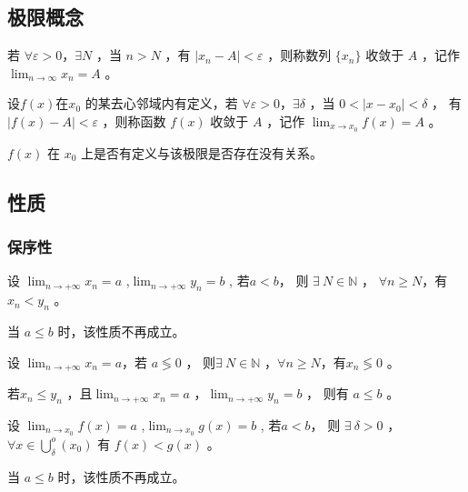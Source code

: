 \subsection{极限概念}

若 $ \forall \varepsilon>0$，$ \exists N $ ，当 $ n>N $ ，有 $ |x_n-A|<\varepsilon $ ，则称数列 $ \{x_n\} $ 收敛于 $ A $  ，记作
$ \displaystyle\lim_{n\rightarrow\infty}x_n=A $ 。

设$ f(x) $在$ x_0 $ 的某去心邻域内有定义，若 $ \forall \varepsilon>0$，$ \exists \delta $ ，当 $ 0<|x-x_0|<\delta $ ，
有 $ |f(x)-A|<\varepsilon $ ，则称函数 $ f(x) $ 收敛于 $ A $  ，记作
$ \displaystyle\lim_{x\rightarrow x_0}f(x)=A $ 。

$ f(x) $ 在 $ x_{0} $ 上是否有定义与该极限是否存在没有关系。

\subsection{性质}

\subsubsection{保序性}

\begin{Theo}[保序性]

    设 $ \displaystyle\lim_{n\rightarrow +\infty}x_n=a $ ,$ \displaystyle\lim_{n\rightarrow +\infty}y_n=b $ ,
    若$ a<b $， 则 $ \exists\ N\in \mathbb{N}$ ， $ \forall n\geq N $，有 $ x_{n}<y_n $ 。
    
    当 $ a\leq b $ 时，该性质不再成立。
\end{Theo}

\begin{Infer}[保号性]

    设 $ \displaystyle\lim_{n\rightarrow +\infty}x_n=a $，若 $ a \lessgtr 0 $ ，
    则$ \exists\ N\in\mathbb{N} $ ，$ \forall n\geq N$，有$ x_{n}\lessgtr0 $  。
\end{Infer}

\begin{Theo}[\ ]

    若$ x_n\leq y_n $ ，且$ \displaystyle\lim_{n\rightarrow+\infty}x_n=a $ ，$ \displaystyle\lim_{n\rightarrow+\infty}y_n=b $ ，
    则有 $ a\leq  b $ 。
\end{Theo}

\begin{Theo}[\ ]

    设 $ \displaystyle\lim_{n\rightarrow x_0}f(x)=a $ ,$ \displaystyle\lim_{n\rightarrow x_0}g(x)=b $ ,
    若$ a<b $， 则 $ \exists\ \delta>0$ ， $ \forall x\in \bigcup\limits^o_\delta(x_0)$ 有 $ f(x)<g(x) $ 。
    
    当 $ a\leq b $ 时，该性质不再成立。
\end{Theo}



